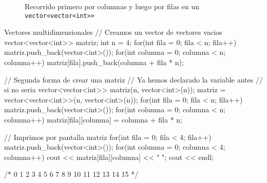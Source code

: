 \documentclass{article}
\begin{document}
    \begin{figure}[h]
        \centering
        \caption{Recorrido primero por columnas y luego por filas en un \texttt{vector<vector<int>>}}
    \end{figure}

    \begin{codelisting}{Vectores multidimensionales}
// Creamos un vector de vectores vacios
vector<vector<int>> matriz;
int n = 4;
for(int fila = 0; fila < n; fila++) {
    matriz.push_back(vector<int>());
    for(int columna = 0; columna < n; columna++) {
        matriz[fila].push_back(columna + fila * n);
    }
}

// Segunda forma de crear una matriz
// Ya hemos declarado la variable antes
// si no seria vector<vector<int>> matriz(n, vector<int>(n));
matriz = vector<vector<int>>(n, vector<int>(n)); 
for(int fila = 0; fila < n; fila++) {
    matriz.push_back(vector<int>());
    for(int columna = 0; columna < n; columna++) {
        matriz[fila][columna] = columna + fila * n;
    }
}

// Imprimos por pantalla matriz
for(int fila = 0; fila < 4; fila++) {
    matriz.push_back(vector<int>());
    for(int columna = 0; columna < 4; columna++) {
        cout << matriz[fila][columna] << " ";
    }
    cout << endl;
}

/*
    0 1 2 3 
    4 5 6 7 
    8 9 10 11 
    12 13 14 15
*/
    \end{codelisting}
 
\end{document}
